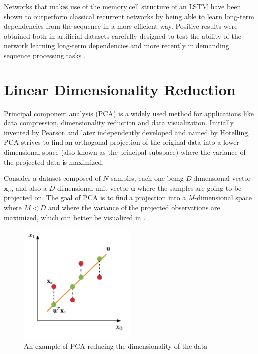\documentclass{kththesis}
\begin{document}
Networks that makes use of the memory cell structure of an LSTM have been shown to outperform classical recurrent networks by being able to learn long-term dependencies from the sequence in a more efficient way. Positive results were obtained both in artificial datasets carefully designed to test the ability of the network learning long-term dependencies \citep{bengio1994learning} and more recently in demanding sequence processing tasks \citep{graves2013speech}\citep{sutskever2014sequence}.

\section{Linear Dimensionality Reduction}

Principal component analysis (PCA) is a widely used method for applications like data compression, dimensionality reduction and data visualization. Initially invented by Pearson\citep{pearson1901liii} and later independently developed and named by Hotelling\citep{hotelling1933analysis}, PCA strives to find an orthogonal projection of the original data into a lower dimensional space (also known as the principal subspace) where the variance of the projected data is maximized.

Consider a dataset composed of $N$ samples, each one being $D$-dimensional vector $\mathbf{x}_n$, and also a $D$-dimensional unit vector $\mathbf{u}$ where the samples are going to be projected on. The goal of PCA is to find a projection into a $M$-dimensional space where $M < D$ and where the variance of the projected observations are maximized, which can better be visualized in .

\begin{figure}[h]
    \centering
    \includegraphics[width=0.5\textwidth,keepaspectratio]{figures/pca.pdf}
    \caption{An example of PCA reducing the dimensionality of the data}
    \label{fig:pca}
\end{figure}
\end{document}
